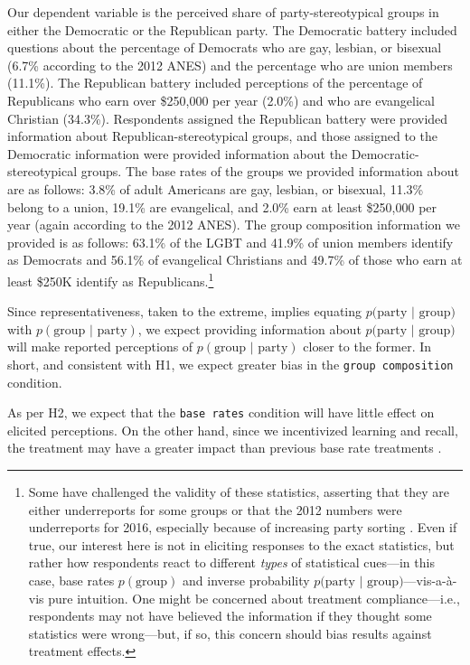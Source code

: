 \documentclass[12pt, letterpaper]{article}
\begin{document}
Our dependent variable is the perceived share of party-stereotypical groups in either the Democratic or the Republican party. The Democratic battery included questions about the percentage of Democrats who are gay, lesbian, or bisexual (6.7\% according to the 2012 ANES) and the percentage who are union members (11.1\%). The Republican battery included perceptions of the percentage of Republicans who earn over \$250,000 per year (2.0\%) and who are evangelical Christian (34.3\%). Respondents assigned the Republican battery were provided information about Republican-stereotypical groups, and those assigned to the Democratic information were provided information about the Democratic-stereotypical groups. The base rates of the groups we provided information about are as follows: 3.8\% of adult Americans are gay, lesbian, or bisexual, 11.3\% belong to a union, 19.1\% are evangelical, and 2.0\% earn at least \$250,000 per year (again according to the 2012 ANES). The group composition information we provided is as follows: 63.1\% of the LGBT and 41.9\% of union members identify as Democrats and 56.1\% of evangelical Christians and 49.7\% of those who earn at least \$250K identify as Republicans.\footnote{Some have challenged the validity of these statistics, asserting that they are either underreports for some groups or that the 2012 numbers were underreports for 2016, especially because of increasing party sorting \citep[e.g.,][]{Levendusky2009}. Even if true, our interest here is not in eliciting responses to the exact statistics, but rather how respondents react to different \emph{types} of statistical cues---in this case, base rates $p(\text{group})$ and inverse probability $p\text{(party | group)}$---vis-a-\`{a}-vis pure intuition. One might be concerned about treatment compliance---i.e., respondents may not have believed the information if they thought some statistics were wrong---but, if so, this concern should bias results against treatment effects.}

Since representativeness, taken to the extreme, implies equating $p\text{(party | group)}$ with $p(\text{group | party})$, we expect providing information about $p\text{(party | group)}$ will make reported perceptions of $p(\text{group | party})$ closer to the former. In short, and consistent with H1, we expect greater bias in the {\tt group composition} condition. 

As per H2, we expect that the {\tt base rates} condition will have little effect on elicited perceptions. On the other hand, since we incentivized learning and recall, the treatment may have a greater impact than previous base rate treatments \citep[e.g.,][]{ahler2018parties}. 
\end{document}
